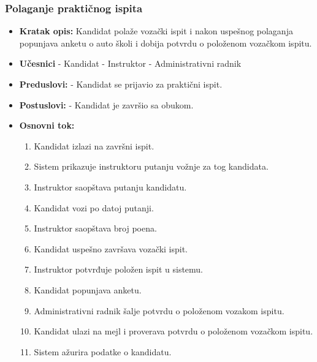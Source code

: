 \subsubsection{Polaganje praktičnog ispita}

\vspace{3mm}

\begin{itemize}

\item \textbf{Kratak opis:} Kandidat polaže vozački ispit i nakon uspešnog polaganja popunjava anketu o auto školi i dobija potvrdu o položenom vozačkom ispitu.

\vspace{2mm}

\item \textbf{Učesnici} \newline
   - Kandidat \newline   
   - Instruktor \newline
   - Administrativni radnik 
   
\item \textbf{Preduslovi:} \newline
   - Kandidat se prijavio za praktični ispit.

\item \textbf{Postuslovi:} \newline
    - Kandidat je završio sa obukom.

\item \textbf{Osnovni tok:}  
   \begin{enumerate}
   \item Kandidat izlazi na završni ispit.
   \item Sistem prikazuje instruktoru putanju vožnje za tog kandidata.
   \item Instruktor saopštava putanju kandidatu.
   \item Kandidat vozi po datoj putanji.
   \item Instruktor saopštava broj poena.
   \item Kandidat uspešno završava vozački ispit.
   \item Instruktor potvrđuje položen ispit u sistemu.
   \item Kandidat popunjava anketu.
   \item Administrativni radnik šalje potvrdu o položenom vozakom ispitu.
   \item Kandidat ulazi na mejl i proverava potvrdu o položenom vozačkom ispitu.
   \item Sistem ažurira podatke o kandidatu.     


\end{enumerate}
\end{itemize}
